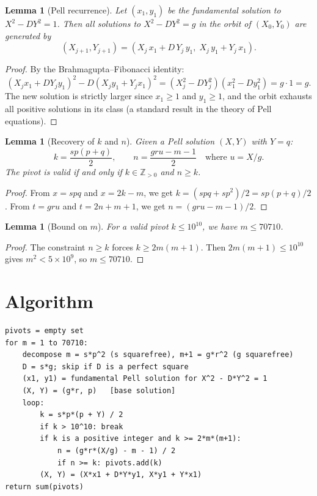 \documentclass[12pt]{article}
\newtheorem{lemma}[theorem]{Lemma}
\begin{document}
\begin{lemma}[Pell recurrence]
\label{lem:recurrence}
Let $(x_1, y_1)$ be the fundamental solution to $X^2 - DY^2 = 1$. Then all solutions to $X^2 - DY^2 = g$ in the orbit of $(X_0, Y_0)$ are generated by
\[
(X_{j+1}, Y_{j+1}) = (X_j\,x_1 + D\,Y_j\,y_1,\; X_j\,y_1 + Y_j\,x_1).
\]
\end{lemma}

\begin{proof}
By the Brahmagupta--Fibonacci identity:
\[
(X_jx_1 + DY_jy_1)^2 - D(X_jy_1 + Y_jx_1)^2 = (X_j^2 - DY_j^2)(x_1^2 - Dy_1^2) = g \cdot 1 = g.
\]
The new solution is strictly larger since $x_1 \ge 1$ and $y_1 \ge 1$, and the orbit exhausts all positive solutions in its class (a standard result in the theory of Pell equations).
\end{proof}

\begin{lemma}[Recovery of $k$ and $n$]
Given a Pell solution $(X, Y)$ with $Y = q$:
\[
k = \frac{sp(p+q)}{2}, \qquad n = \frac{gru - m - 1}{2} \quad\text{where } u = X/g.
\]
The pivot is valid if and only if $k \in \mathbb{Z}_{>0}$ and $n \ge k$.
\end{lemma}

\begin{proof}
From $x = spq$ and $x = 2k - m$, we get $k = (spq + sp^2)/2 = sp(p+q)/2$. From $t = gru$ and $t = 2n+m+1$, we get $n = (gru-m-1)/2$.
\end{proof}

\begin{lemma}[Bound on $m$]
For a valid pivot $k \le 10^{10}$, we have $m \le 70710$.
\end{lemma}

\begin{proof}
The constraint $n \ge k$ forces $k \ge 2m(m+1)$. Then $2m(m+1) \le 10^{10}$ gives $m^2 < 5\times 10^9$, so $m \le 70710$.
\end{proof}

\section{Algorithm}

\begin{verbatim}
pivots = empty set
for m = 1 to 70710:
    decompose m = s*p^2 (s squarefree), m+1 = g*r^2 (g squarefree)
    D = s*g; skip if D is a perfect square
    (x1, y1) = fundamental Pell solution for X^2 - D*Y^2 = 1
    (X, Y) = (g*r, p)   [base solution]
    loop:
        k = s*p*(p + Y) / 2
        if k > 10^10: break
        if k is a positive integer and k >= 2*m*(m+1):
            n = (g*r*(X/g) - m - 1) / 2
            if n >= k: pivots.add(k)
        (X, Y) = (X*x1 + D*Y*y1, X*y1 + Y*x1)
return sum(pivots)
\end{verbatim}
\end{document}

